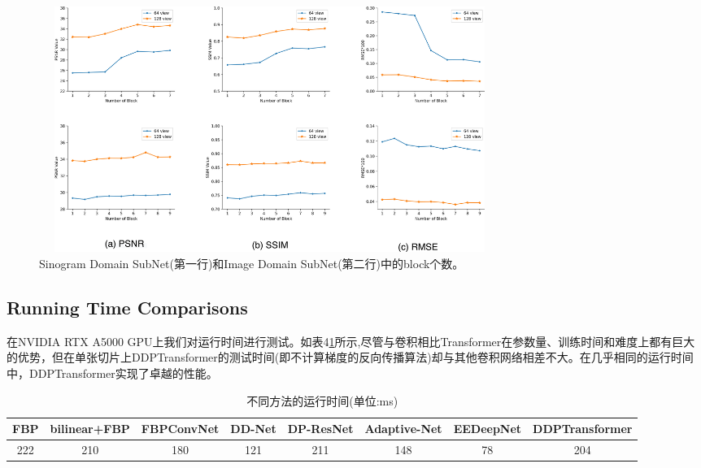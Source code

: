 \begin{figure}
	\centering
	\includegraphics[height=8cm,width=15cm]{12.eps}
	\caption{Sinogram Domain SubNet(第一行)和Image Domain SubNet(第二行)中的block个数。}
	\label{fig10}
\end{figure}
\begin{table}[H]
	\centering
	\caption{不同Transformer的性能结果 (均值$\pm$方差),最好的值用红色标出。}
	\label{tab3}
\end{table}
\subsection{Running Time Comparisons}
在NVIDIA RTX A5000 GPU上我们对运行时间进行测试。如表4\ref{tab4}所示,尽管与卷积相比Transformer在参数量、训练时间和难度上都有巨大的优势，但在单张切片上DDPTransformer的测试时间(即不计算梯度的反向传播算法)却与其他卷积网络相差不大。在几乎相同的运行时间中，DDPTransformer实现了卓越的性能。
\begin{table}[H]
	\centering
	\begin{tabular}{cccccccc}
		\hline
		FBP & bilinear+FBP & FBPConvNet & DD-Net & DP-ResNet & Adaptive-Net & EEDeepNet & DDPTransformer\\ 
		\hline
		222 & 210 & 180 & 121 & 211 & 148 & 78 & 204 \\
		\hline
	\end{tabular}
	\caption{不同方法的运行时间(单位:ms)}
	\label{tab4}
\end{table}
